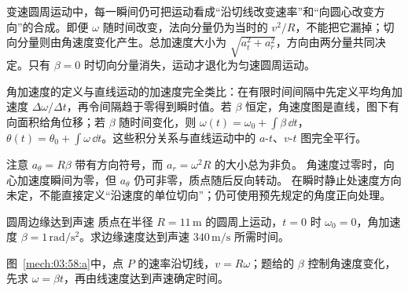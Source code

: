 {变速圆周运动中，每一瞬间仍可把运动看成“沿切线改变速率”和“向圆心改变方向”的合成。即便 $\omega$ 随时间改变，法向分量仍为当时的 $v^2/R$，不能把它漏掉；切向分量则由角速度变化产生。总加速度大小为 $\sqrt{a_t^2+a_r^2}$，方向由两分量共同决定。只有 $\beta=0$ 时切向分量消失，运动才退化为匀速圆周运动。

角加速度的定义与直线运动的加速度完全类比：在有限时间间隔中先定义平均角加速度 $\Delta\omega/\Delta t$，再令间隔趋于零得到瞬时值。若 $\beta$ 恒定，角速度图是直线，图下有向面积给角位移；若 $\beta$ 随时间变化，则 $\omega(t)=\omega_0+\int\beta\,\dd t$，$\theta(t)=\theta_0+\int\omega\,\dd t$。这些积分关系与直线运动中的 $a$-$t$、$v$-$t$ 图完全平行。

注意 $a_\theta=R\beta$ 带有方向符号，而 $a_r=\omega^2R$ 的大小总为非负。
角速度过零时，向心加速度瞬间为零，但 $a_\theta$ 仍可非零，质点随后反向转动。
在瞬时静止处速度方向未定，不能直接定义“沿速度的单位切向”；仍可使用预先规定的角度正向处理。

\begin{origexamplebox}{圆周边缘达到声速}\label{ch03:ex:k05-2-58}
质点在半径 $R=11\,\mathrm m$ 的圆周上运动，$t=0$ 时 $\omega_0=0$，角加速度 $\beta=1\,\mathrm{rad/s^2}$。求边缘速度达到声速 $340\,\mathrm{m/s}$ 所需时间。

\begin{qualityfigure}
\label{mech:03:58:q}
\end{qualityfigure}
\end{origexamplebox}
\begin{xesolution}
\begin{qualityfigure}
\label{mech:03:58:a}
\end{qualityfigure}
图~\ref{mech:03:58:a}中，点 $P$ 的速率沿切线，$v=R\omega$；题给的 $\beta$ 控制角速度变化，先求 $\omega=\beta t$，再由线速度达到声速确定时间。


\end{xesolution}}
